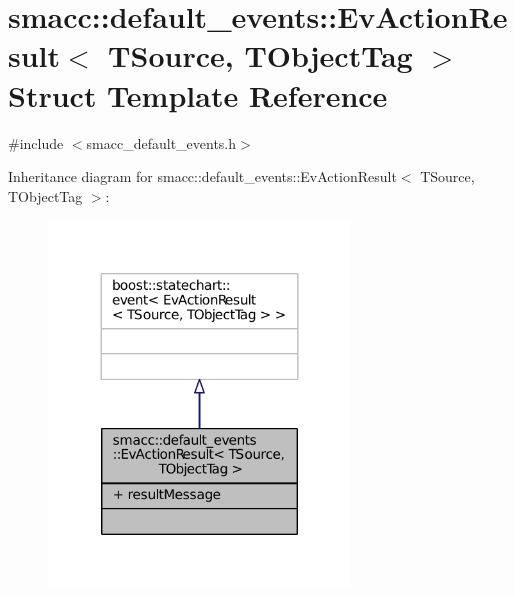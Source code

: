\hypertarget{structsmacc_1_1default__events_1_1EvActionResult}{}\section{smacc\+:\+:default\+\_\+events\+:\+:Ev\+Action\+Result$<$ T\+Source, T\+Object\+Tag $>$ Struct Template Reference}
\label{structsmacc_1_1default__events_1_1EvActionResult}


{\ttfamily \#include $<$smacc\+\_\+default\+\_\+events.\+h$>$}



Inheritance diagram for smacc\+:\+:default\+\_\+events\+:\+:Ev\+Action\+Result$<$ T\+Source, T\+Object\+Tag $>$\+:
\nopagebreak
\begin{figure}[H]
\begin{center}
\leavevmode
\includegraphics[width=227pt]{structsmacc_1_1default__events_1_1EvActionResult__inherit__graph}
\end{center}
\end{figure}


